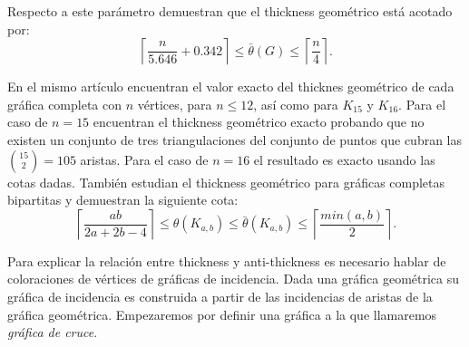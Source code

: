 
Respecto a este parámetro \cite{Dillencourt2004} demuestran que el thickness
geométrico está acotado por:
\[ \left\lceil \frac{n}{5.646} + 0.342 \right\rceil \leq  \bar{\theta}(G) \leq \left\lceil\frac{n}{4}\right\rceil .\]

En el mismo artículo encuentran el valor exacto del thicknes geométrico
de cada gráfica completa con $n$ vértices, para $n\leq 12$, así como para $K_{15}$ y $K_{16}$.
Para el caso de $n=15$ encuentran el thickness geométrico exacto probando
que no existen un conjunto de tres triangulaciones del conjunto de puntos que
cubran las $\binom{15}{2} = 105$ aristas. Para el caso de $n=16$ el resultado
es exacto usando las cotas dadas.
También estudian el thickness geométrico para gráficas completas bipartitas y demuestran la
siguiente cota:
\[
  \left\lceil \frac{ab}{2a+2b-4} \right\rceil \leq \theta(K_{a,b}) \leq \bar{\theta}(K_{a,b})
  \leq \left\lceil \frac{min(a,b)}{2} \right\rceil.
\]


Para explicar la relación entre thickness y anti-thickness es necesario hablar
de coloraciones de vértices de gráficas de incidencia. Dada una gráfica geométrica
su gráfica de incidencia es construida a partir de las incidencias de aristas de la gráfica geométrica.
Empezaremos por definir una gráfica a la que llamaremos \emph{gráfica de cruce}.

